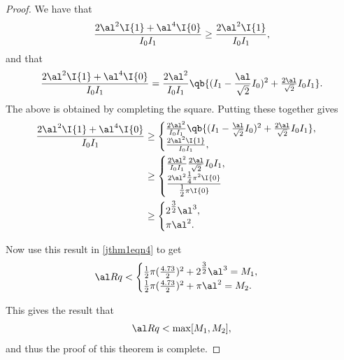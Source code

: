 \begin{proof}
    We have that 
    \begin{equation}
        \frac{2 \al^2 \I{1} + \al^4 \I{0}}{I_0 I_1} \geq \frac{2 \al^2 \I{1}}{I_0 I_1},
    \end{equation}
    and that 
    \begin{equation}
        \frac{2 \al^2 \I{1} + \al^4 \I{0}}{I_0 I_1} = \frac{2 \al^2}{I_0 I_1} \qb{(I_1 - \frac{\al}{\sqrt{2}} I_0)^2 + \tfrac{2 \al}{\sqrt{2}} I_0 I_1}.
        \label{jthm1eqn4}
    \end{equation}
    The above is obtained by completing the square. Putting these together gives
    \begin{align}
        \frac{2 \al^2 \I{1} + \al^4 \I{0}}{I_0 I_1} &\geq
        \begin{cases}
            \frac{2 \al^2}{I_0 I_1} \qb{(I_1 - \frac{\al}{\sqrt{2}} I_0)^2 + \tfrac{2 \al}{\sqrt{2}} I_0 I_1}, \\
            \frac{2 \al^2 \I{1}}{I_0 I_1},
        \end{cases} \nonumber\\
        &\geq \begin{cases}
            \frac{2 \al^2}{I_0 I_1} \frac{2 \al}{\sqrt{2}} I_0 I_1, \\
            \frac{2 \al^2 \tfrac{1}{4} \pi^2 \I{0}}{\tfrac{1}{2} \pi \I{0}}
        \end{cases} \nonumber\\
        &\geq \begin{cases}
            2^{\tfrac{3}{2}} \al^3, \\
            \pi \al^2.
        \end{cases}
    \end{align}

    Now use this result in \eqref{jthm1eqn4} to get 
    \begin{equation}
        \al R q < \begin{cases}
            \tfrac{1}{2} \pi (\frac{4.73}{2})^2 + 2^{\tfrac{3}{2}} \al^3 = M_1, \\
            \tfrac{1}{2} \pi (\frac{4.73}{2})^2 + \pi \al^2 = M_2.
        \end{cases}
    \end{equation}

    This gives the result that 
    \begin{equation}
        \al R q < \max[M_1, M_2],
    \end{equation}
    and thus the proof of this theorem is complete.
\end{proof}


